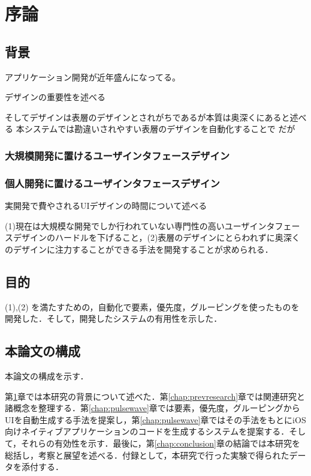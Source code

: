 \chapter{序論}
\label{chap:introduction}

\section{背景}

アプリケーション開発が近年盛んになってる。

デザインの重要性を述べる

そしてデザインは表層のデザインとされがちであるが本質は奥深くにあると述べる
本システムでは勘違いされやすい表層のデザインを自動化することで
だが

\subsection{大規模開発に置けるユーザインタフェースデザイン}
\subsection{個人開発に置けるユーザインタフェースデザイン}
実開発で費やされるUIデザインの時間について述べる

(1)現在は大規模な開発でしか行われていない専門性の高いユーザインタフェースデザインのハードルを下げること，(2)表層のデザインにとらわれずに奥深くのデザインに注力することができる手法を開発することが求められる．

\section{目的}
(1),(2) を満たすための，自動化で要素，優先度，グルーピングを使ったものを開発した．そして，開発したシステムの有用性を示した．
%
\section{本論文の構成}

本論文の構成を示す．

第\ref{chap:introduction}章では本研究の背景について述べた．第\ref{chap:prevresearch}章では関連研究と諸概念を整理する．第\ref{chap:pulsewave}章では要素，優先度，グルーピングからUIを自動生成する手法を提案し，第\ref{chap:pulsewave}章ではその手法をもとにiOS向けネイティブアプリケーションのコードを生成するシステムを提案する．そして，それらの有効性を示す．最後に，第\ref{chap:conclusion}章の結論では本研究を総括し，考察と展望を述べる．付録として，本研究で行った実験で得られたデータを添付する．
